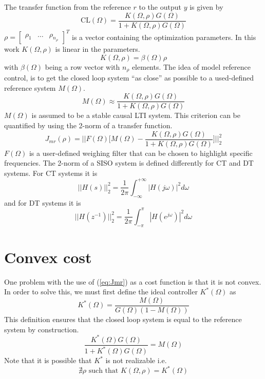 The transfer function from the reference $r$ to the output $y$ is given by
\begin{equation*}
    \text{CL}(\Omega) = \frac{K(\Omega,\rho) G(\Omega)}{1 + K(\Omega,\rho) G(\Omega)}
\end{equation*}
$\rho = \begin{bmatrix}
        \rho_1 & \ldots & \rho_{n_{\rho}}
\end{bmatrix}^T$ is a vector containing the optimization parameters. In this work $K(\Omega,\rho)$ is linear in the parameters.
\begin{equation}
    K(\Omega,\rho) = \beta(\Omega) \rho
    \label{eq:linear_in_the_parameters}
\end{equation}
with $\beta(\Omega)$ being a row vector with $n_\rho$ elements.
The idea of model reference control, is to get the closed loop system ``as close'' as possible to a used-defined reference system $M(\Omega)$.
\begin{equation*}
    M(\Omega) \approx \frac{K(\Omega,\rho) G(\Omega)}{1 + K(\Omega,\rho) G(\Omega)}
\end{equation*}
$M(\Omega)$ is assumed to be a stable causal LTI system. This criterion can be quantified by using the 2-norm of a transfer function.
\begin{equation}
    J_{mr}(\rho) =  \Big|\Big|F(\Omega) \Big[M(\Omega)-\frac{K(\Omega,\rho) G(\Omega)}{1 + K(\Omega,\rho) G(\Omega)}\Big]  \Big|\Big|_2^2 
    \label{eq:Jmr}
\end{equation}
$F(\Omega)$ is a user-defined weighing filter that can be chosen to highlight specific frequencies. The 2-norm of a SISO system is defined differently for CT and DT systems. For CT systems it is
\begin{equation*}
    ||H(s)||_2^2 = \frac{1}{2\pi} \int_{-\infty}^{+\infty} |H(j\omega)|^2 d\omega
\end{equation*}
and for DT systems it is
\begin{equation*}
    ||H(z^{-1})||_2^2 = \frac{1}{2\pi} \int_{-\pi}^{\pi} |H(e^{j\omega})|^2 d\omega
\end{equation*}

\newpage
 \section{Convex cost}
One problem with the use of (\ref{eq:Jmr}) as a cost function is that it is not convex.
In order to solve this, we must first define the ideal controller $K^*(\Omega)$ as
\begin{equation}
    K^*(\Omega) = \frac{M(\Omega)}{G(\Omega)(1-M(\Omega))}
    \label{eq:Kstar_def}
\end{equation}
This definition ensures that the closed loop system is equal to the reference system by construction.
\begin{equation*}
    \frac{K^*(\Omega) G(\Omega)}{1 + K^*(\Omega) G(\Omega)} = M(\Omega)
\end{equation*}
Note that it is possible that $K^*$ is not realizable i.e. 
\begin{equation*}
    \nexists \rho \text{ such that } K(\Omega,\rho) = K^*(\Omega)
\end{equation*}

